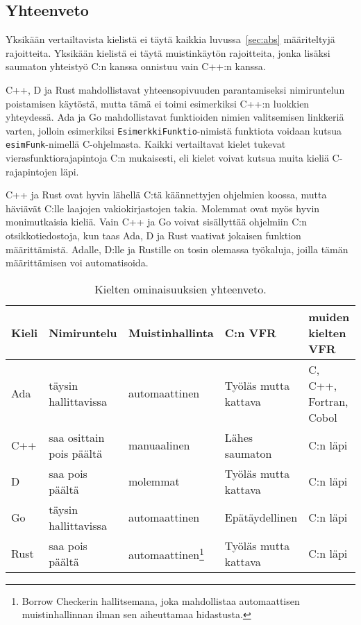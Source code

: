 \newpage

\subsection{Yhteenveto}

Yksikään vertailtavista kielistä ei täytä kaikkia luvussa~\ref{sec:abs}
määriteltyjä rajoitteita. Yksikään kielistä ei täytä muistinkäytön rajoitteita,
jonka lisäksi saumaton yhteistyö C:n kanssa onnistuu vain C++:n kanssa.

C++, D ja Rust mahdollistavat yhteensopivuuden parantamiseksi nimiruntelun
poistamisen käytöstä, mutta tämä ei toimi esimerkiksi C++:n luokkien
yhteydessä. Ada ja Go mahdollistavat funktioiden nimien valitsemisen linkkeriä
varten, jolloin esimerkiksi \texttt{EsimerkkiFunktio}-nimistä funktiota voidaan
kutsua \texttt{esimFunk}-nimellä C-ohjelmasta. Kaikki vertailtavat kielet
tukevat vierasfunktiorajapintoja C:n mukaisesti, eli kielet voivat kutsua muita
kieliä C-rajapintojen läpi.

C++ ja Rust ovat hyvin lähellä C:tä käännettyjen ohjelmien koossa, mutta
häviävät C:lle laajojen vakiokirjastojen takia. Molemmat ovat myös hyvin
monimutkaisia kieliä. Vain C++ ja Go voivat sisällyttää ohjelmiin C:n
otsikkotiedostoja, kun taas Ada, D ja Rust vaativat jokaisen funktion
määrittämistä. Adalle, D:lle ja Rustille on tosin olemassa työkaluja, joilla
tämän määrittämisen voi automatisoida.

\begin{table}[ht!]
    \begin{adjustbox}{center}
    \kern -1cm
    \begin{tabular}{@{}lllll@{}} \toprule
        Kieli & Nimiruntelu   & Muistinhallinta                                     & C:n VFR               & muiden kielten VFR \\ \midrule
        Ada   & täysin hallittavissa & automaattinen                                       & Työläs mutta kattava  & C, C++, Fortran, Cobol \\
        C++   & saa osittain pois päältä      & manuaalinen                                         & Lähes saumaton        & C:n läpi \\
        D     & saa pois päältä      & molemmat                                            & Työläs mutta kattava  & C:n läpi \\
        Go    & täysin hallittavissa      & automaattinen                                       & Epätäydellinen        & C:n läpi \\
        Rust  & saa pois päältä & automaattinen\footnote{Borrow Checkerin hallitsemana, joka mahdollistaa automaattisen muistinhallinnan ilman sen aiheuttamaa hidastusta.} & Työläs mutta kattava  & C:n läpi \\ \bottomrule
    \end{tabular}
    \end{adjustbox}
    \caption{
        Kielten ominaisuuksien yhteenveto.
    }
    \label{table:properties}
\end{table}

